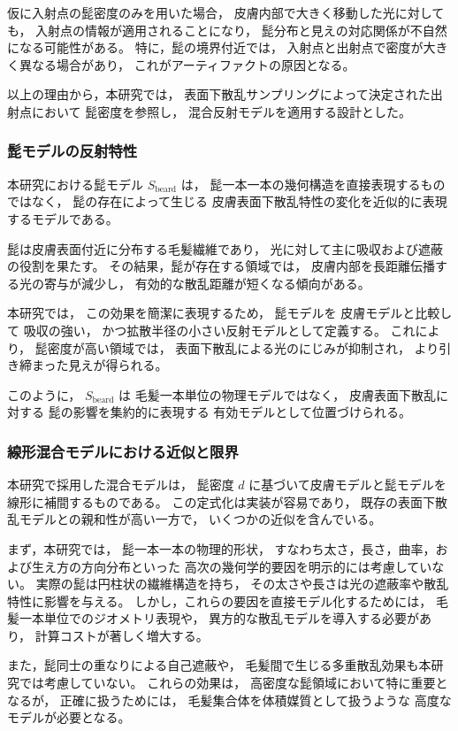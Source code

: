 仮に入射点の髭密度のみを用いた場合，
皮膚内部で大きく移動した光に対しても，
入射点の情報が適用されることになり，
髭分布と見えの対応関係が不自然になる可能性がある。
特に，髭の境界付近では，
入射点と出射点で密度が大きく異なる場合があり，
これがアーティファクトの原因となる。

以上の理由から，本研究では，
表面下散乱サンプリングによって決定された出射点において
髭密度を参照し，
混合反射モデルを適用する設計とした。
\subsubsection{髭モデルの反射特性}
本研究における髭モデル $S_{\mathrm{beard}}$ は，
髭一本一本の幾何構造を直接表現するものではなく，
髭の存在によって生じる
皮膚表面下散乱特性の変化を近似的に表現するモデルである。

髭は皮膚表面付近に分布する毛髪繊維であり，
光に対して主に吸収および遮蔽の役割を果たす。
その結果，髭が存在する領域では，
皮膚内部を長距離伝播する光の寄与が減少し，
有効的な散乱距離が短くなる傾向がある。

本研究では，
この効果を簡潔に表現するため，
髭モデルを
皮膚モデルと比較して
吸収の強い，
かつ拡散半径の小さい反射モデルとして定義する。
これにより，
髭密度が高い領域では，
表面下散乱による光のにじみが抑制され，
より引き締まった見えが得られる。

このように，
$S_{\mathrm{beard}}$ は
毛髪一本単位の物理モデルではなく，
皮膚表面下散乱に対する
髭の影響を集約的に表現する
有効モデルとして位置づけられる。

\subsubsection{線形混合モデルにおける近似と限界}
本研究で採用した混合モデルは，
髭密度 $d$ に基づいて皮膚モデルと髭モデルを線形に補間するものである。
この定式化は実装が容易であり，
既存の表面下散乱モデルとの親和性が高い一方で，
いくつかの近似を含んでいる。

まず，本研究では，
髭一本一本の物理的形状，
すなわち太さ，長さ，曲率，および生え方の方向分布といった
高次の幾何学的要因を明示的には考慮していない。
実際の髭は円柱状の繊維構造を持ち，
その太さや長さは光の遮蔽率や散乱特性に影響を与える。
しかし，これらの要因を直接モデル化するためには，
毛髪一本単位でのジオメトリ表現や，
異方的な散乱モデルを導入する必要があり，
計算コストが著しく増大する。

また，髭同士の重なりによる自己遮蔽や，
毛髪間で生じる多重散乱効果も本研究では考慮していない。
これらの効果は，
高密度な髭領域において特に重要となるが，
正確に扱うためには，
毛髪集合体を体積媒質として扱うような
高度なモデルが必要となる。

